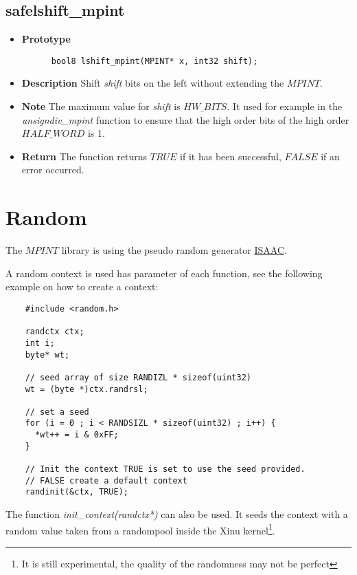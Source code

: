 \documentclass[10pt,a4paper]{article}
\begin{document}
  \subsection{safelshift\_mpint}
  
  \begin{itemize}
    \item [] \textbf{Prototype}
    \begin{lstlisting}
      bool8 lshift_mpint(MPINT* x, int32 shift);
    \end{lstlisting}
    \item [] \textbf{Description} Shift \textit{shift} bits on the left without extending the $MPINT$.
    \item [] \textbf{Note} The maximum value for \textit{shift} is $HW\_BITS$. It used for example in the \textit{unsigndiv\_mpint} function to ensure that the
    high order bits of the high order $HALF\_WORD$ is 1.
    \item [] \textbf{Return} The function returns $TRUE$ if it has been successful, $FALSE$ if an error occurred.
  \end{itemize}
  
  \section{Random}
  
  The $MPINT$ library is using the pseudo random generator \href{http://burtleburtle.net/bob/rand/isaacafa.html}{ISAAC}.
  
  A random context is used has parameter of each function, see the following example on how to create a context:
  
  \begin{lstlisting}
    #include <random.h>
    
    randctx ctx;
    int i;
    byte* wt;
    
    // seed array of size RANDIZL * sizeof(uint32)
    wt = (byte *)ctx.randrsl;
    
    // set a seed
    for (i = 0 ; i < RANDSIZL * sizeof(uint32) ; i++) {
      *wt++ = i & 0xFF;
    }
    
    // Init the context TRUE is set to use the seed provided.
    // FALSE create a default context
    randinit(&ctx, TRUE);
  \end{lstlisting}
  
  The function \textit{init\_context(randctx*)} can also be used. It seeds the context with a random value taken from a randompool inside the Xinu kernel\footnote{It is still experimental,
    the quality of the randomness may not be perfect}.
  
\end{document}
